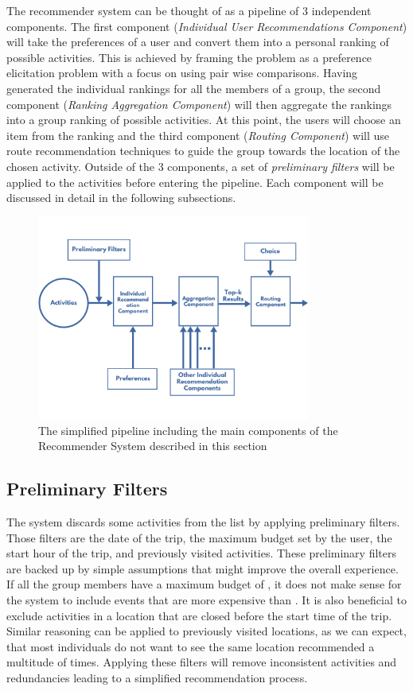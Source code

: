 \documentclass[11pt,a4paper,oneside]{article}
\begin{document}
The recommender system can be thought of as a pipeline of 3 independent components. The first component (\emph{Individual User Recommendations Component}) will take the preferences of a user and convert them into a personal ranking of possible activities. This is achieved by framing the problem as a preference elicitation problem with a focus on using pair wise comparisons. Having generated the individual rankings for all the members of a group, the second component (\emph{Ranking Aggregation Component}) will then aggregate the rankings into a group ranking of possible activities. At this point, the users will choose an item from the ranking and the third component (\emph{Routing Component}) will use route recommendation techniques to guide the group towards the location of the chosen activity. Outside of the 3 components, a set of \emph{preliminary filters} will be applied to the activities before entering the pipeline. Each component will be discussed in detail in the following subsections.

\begin{figure}[H]
    \centering
    \includegraphics[width=0.8\textwidth]{paper/imgs/chart_ais.png}
    \caption{The simplified pipeline including the main components of the Recommender System described in this section}
    \label{fig:pipeline}
\end{figure}

\subsection{Preliminary Filters}
The system discards some activities from the list by applying preliminary filters. Those filters are the date of the trip, the maximum budget set by the user, the start hour of the trip, and previously visited activities. These preliminary filters are backed up by simple assumptions that might improve the overall experience. If all the group members have a maximum budget of , it does not make sense for the system to include events that are more expensive than . It is also beneficial to exclude activities in a location that are closed before the start time of the trip. Similar reasoning can be applied to previously visited locations, as we can expect, that most individuals do not want to see the same location recommended a multitude of times. Applying these filters will remove inconsistent activities and redundancies leading to a simplified recommendation process.
\end{document}
